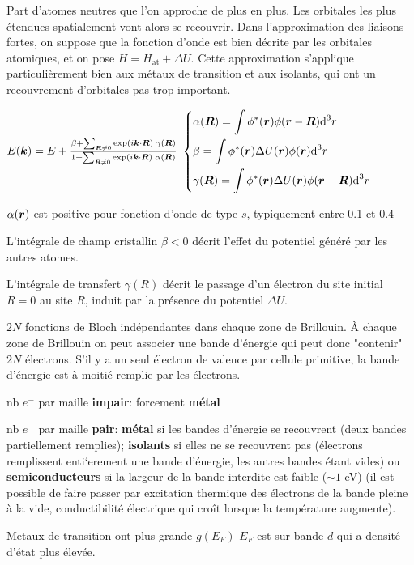 Part d'atomes neutres que l'on approche de plus en plus.
Les orbitales les plus étendues spatialement vont alors se recouvrir. Dans l'approximation
des liaisons fortes, on suppose que la fonction d'onde est bien décrite par les orbitales
atomiques, et on pose $H = H_{\text{at}} + \Delta U$. 
Cette approximation s'applique particulièrement
bien aux métaux de transition et aux isolants, qui ont un recouvrement d'orbitales pas
trop important.
\begin{squishlist}
    \item $E(\bm{k}) = E + \frac{\beta + \sum_{\bm{R} \neq 0}\exp(i\bm{k} \cdot \bm{R}) \; \gamma(\bm{R})}{1 + \sum_{\bm{R} \neq 0}\exp(i\bm{k} \cdot \bm{R})\; \alpha(\bm{R})}$
    $\left\{ \begin{aligned}
        & \alpha(\bm{R}) = \int \phi^*(\bm{r})\phi(\bm{r} - \bm{R}) \textrm{d}^3 r \\
        & \beta = \int \phi^*(\bm{r})\Delta U (\bm{r}) \phi(\bm{r}) \textrm{d}^3 r \\
        & \gamma(\bm{R}) = \int \phi^*(\bm{r})\Delta U (\bm{r}) \phi(\bm{r} - \bm{R}) \textrm{d}^3 r
    \end{aligned} \right.$
    \item $\alpha(\bm{r})$ est positive pour fonction d'onde de type $s$, typiquement entre 0.1 et 0.4
    \item L'intégrale de champ cristallin $\beta < 0$ décrit l'effet du potentiel généré par les autres atomes.
    \item L'intégrale de transfert $\gamma(R)$ décrit le passage d'un électron du site initial $R = 0$ au site $R$, induit par la présence du potentiel $\Delta U$.
\end{squishlist}

$2N$ fonctions de Bloch indépendantes dans chaque zone de Brillouin.
À chaque zone de Brillouin on peut associer une bande d'énergie qui peut donc "contenir" $2N$ électrons.
S’il y a un seul électron de valence par cellule primitive, la bande d’énergie
est à moitié remplie par les électrons.
\begin{squishlist}
    \item  nb $e^-$ par maille \textbf{impair}: forcement \textbf{métal}
    \item  nb $e^-$ par maille \textbf{pair}: \textbf{métal} si les bandes d'énergie se recouvrent (deux bandes partiellement remplies); \textbf{isolants} si elles ne se recouvrent pas (électrons remplissent enti`erement une bande d’énergie, les autres bandes étant vides) ou \textbf{semiconducteurs} si la largeur de la bande interdite est faible ($\sim 1 $ eV) (il est possible de faire passer par excitation thermique des électrons de la bande pleine à la vide, conductibilité électrique qui croît lorsque la température augmente).
    \item Metaux de transition ont plus grande $g(E_F)$ $E_F$ est sur bande $d$ qui a densité d'état plus élevée.
\end{squishlist}


